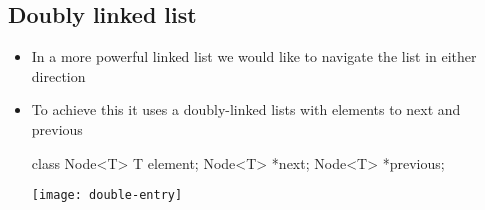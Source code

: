 



\Outline


\begin{slide}
\section{Doubly linked list}

\vspace{-1.5cm}
\begin{PauseHighLight}
\begin{itemize}\squeeze
\item In a more powerful linked list we would like to navigate the
  list in either direction\pause
\item To achieve this it uses a doubly-linked lists with elements to
  next and previous
\begin{java}
  class Node<T>
  {
    T element;
    Node<T> *next;
    Node<T> *previous;
  }
\end{java}\pause
\vspace{-2cm}
\begin{center}
  \texttt{[image: double-entry]}\pause
\end{center}
\vspace{-1cm}
\end{itemize}
\end{PauseHighLight}
\end{slide}

